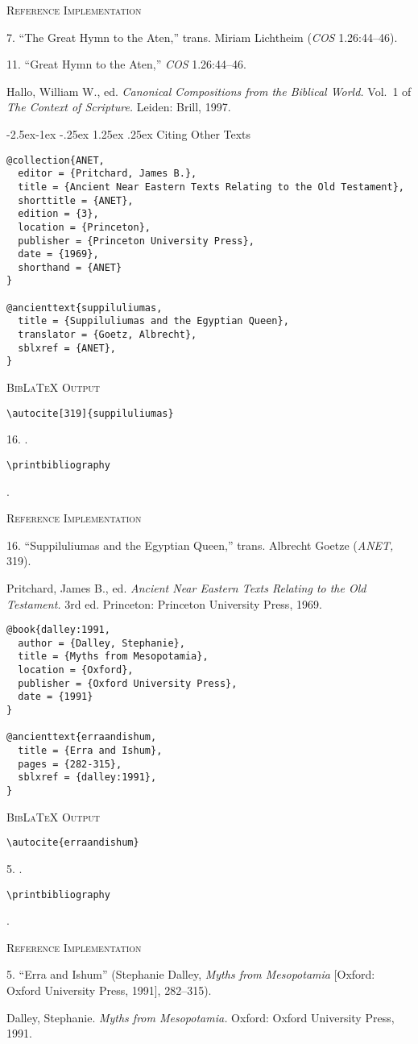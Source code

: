 \documentclass[a4paper]{article}
\makeatletter
\renewcommand\paragraph{\@startsection{paragraph}{4}{\z@}%
            {-2.5ex\@plus -1ex \@minus -.25ex}%
            {1.25ex \@plus .25ex}%
            {\normalfont\normalsize\bfseries}}
\newcommand\citetestnsbib[4]{%
  {\textsc{BibLaTeX Output}\par
   \nobreak
   \texttt{\textbackslash autocite[#2]\{#3\}}\par
   \color{biblatex-colour}
   #1. \cite[#2]{#3}.\par
   \color{black}
   \texttt{\textbackslash printbibliography}\par
   \color{biblatex-colour}
   \hangindent\bibindent\bibentrycite{#4}.\par}}
\newcommand\citetestnsnpbib[3]{%
  {\textsc{BibLaTeX Output}\par
   \nobreak
   \texttt{\textbackslash autocite\{#2\}}\par
   \color{biblatex-colour}
   #1. \cite{#2}.\par
   \color{black}
   \texttt{\textbackslash printbibliography}\par
   \color{biblatex-colour}
   \hangindent\bibindent\bibentrycite{#3}.\par}}
\newenvironment{refimp}{%
  \begin{minipage}{\linewidth}
    \setlength{\parskip}{1ex}
    \textsc{Reference Implementation}\par
    \nobreak
    \color{reference-colour}
}{\end{minipage}}
\makeatother
\begin{document}
\begin{refimp}
  7. “The Great Hymn to the Aten,” trans. Miriam Lichtheim (\emph{COS}
  1.26:44–46).

  11. “Great Hymn to the Aten,” \emph{COS} 1.26:44–46.

  \hangindent\bibindent Hallo, William W., ed. \emph{Canonical Compositions
  from the Biblical World.} Vol.~1 of \emph{The Context of Scripture.} Leiden:
  Brill, 1997.
\end{refimp}

\paragraph{Citing Other Texts}

\begin{lstlisting}
@collection{ANET,
  editor = {Pritchard, James B.},
  title = {Ancient Near Eastern Texts Relating to the Old Testament},
  shorttitle = {ANET},
  edition = {3},
  location = {Princeton},
  publisher = {Princeton University Press},
  date = {1969},
  shorthand = {ANET}
}

@ancienttext{suppiluliumas,
  title = {Suppiluliumas and the Egyptian Queen},
  translator = {Goetz, Albrecht},
  sblxref = {ANET},
}
\end{lstlisting}

\citetestnsbib{16}{319}{suppiluliumas}{ANET}

\begin{refimp}
  16. “Suppiluliumas and the Egyptian Queen,” trans. Albrecht Goetze
  (\emph{ANET,} 319).

  \hangindent\bibindent Pritchard, James B., ed. \emph{Ancient Near Eastern
  Texts Relating to the Old Testament.} 3rd ed. Princeton: Princeton
  University Press, 1969.
\end{refimp}

\begin{lstlisting}
@book{dalley:1991,
  author = {Dalley, Stephanie},
  title = {Myths from Mesopotamia},
  location = {Oxford},
  publisher = {Oxford University Press},
  date = {1991}
}

@ancienttext{erraandishum,
  title = {Erra and Ishum},
  pages = {282-315},
  sblxref = {dalley:1991},
}
\end{lstlisting}

\citetestnsnpbib{5}{erraandishum}{dalley:1991}

\begin{refimp}
  5. “Erra and Ishum” (Stephanie Dalley, \emph{Myths from Mesopotamia}
  [Oxford: Oxford University Press, 1991], 282–315).
  
  \hangindent\bibindent Dalley, Stephanie. \emph{Myths from Mesopotamia.}
  Oxford: Oxford University Press, 1991.
\end{refimp}
\end{document}
